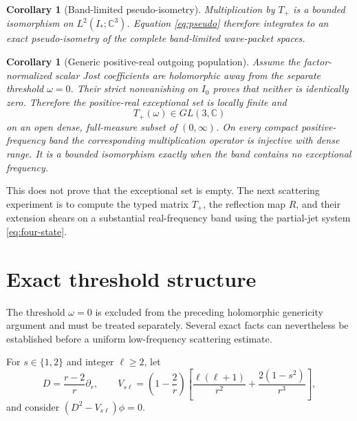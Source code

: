 \documentclass[11pt]{article}
\newtheorem{corollary}[theorem]{Corollary}
\theoremstyle{definition}
\theoremstyle{remark}
\newcommand{\C}{\mathbb C}
\begin{document}
\begin{corollary}[Band-limited pseudo-isometry]
Multiplication by \(T_+\) is a bounded isomorphism on
\(L^2(I_*;\C^3)\).  Equation \eqref{eq:pseudo} therefore integrates to an
exact pseudo-isometry of the complete band-limited wave-packet spaces.
\end{corollary}

\begin{corollary}[Generic positive-real outgoing population]
\label{cor:generic-outgoing}
Assume the factor-normalized scalar Jost coefficients are holomorphic away
from the separate threshold \(\omega=0\).  Their strict nonvanishing on
\(I_0\) proves that neither is identically zero.  Therefore the positive-real
exceptional set is locally finite and
\[
T_+(\omega)\in GL(3,\C)
\]
on an open dense, full-measure subset of \((0,\infty)\).
On every compact positive-frequency band the corresponding multiplication
operator is injective with dense range.  It is a bounded isomorphism exactly
when the band contains no exceptional frequency.
\end{corollary}

This does not prove that the exceptional set is empty.  The next scattering
experiment is to compute the typed matrix \(T_+\), the reflection map \(R\),
and their extension shears on a substantial real-frequency band using the
partial-jet system \eqref{eq:four-state}.

\section{Exact threshold structure}
\label{sec:threshold}

The threshold \(\omega=0\) is excluded from the preceding holomorphic
genericity argument and must be treated separately.  Several exact facts can
nevertheless be established before a uniform low-frequency scattering
estimate.

For \(s\in\{1,2\}\) and integer \(\ell\ge2\), let
\[
D=\frac{r-2}{r}\partial_r,\qquad
V_{s\ell}
=
\left(1-\frac2r\right)
\left[
\frac{\ell(\ell+1)}{r^2}
+\frac{2(1-s^2)}{r^3}
\right],
\]
and consider \((D^2-V_{s\ell})\phi=0\).
\end{document}
